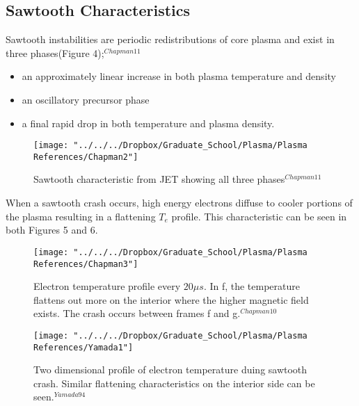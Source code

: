 \documentclass{article}
\begin{document}
\subsection{Sawtooth Characteristics}
Sawtooth instabilities are periodic redistributions of core plasma and exist in three phases(Figure 4);$^{Chapman11}$
\begin{itemize}
\item an approximately linear increase in both plasma temperature and density
\item an oscillatory precursor phase
\item a final rapid drop in both temperature and plasma density.
\end{itemize}
\begin{figure}[p]
\centering
\texttt{[image: "../../../Dropbox/Graduate\_School/Plasma/Plasma References/Chapman2"]}
\caption{Sawtooth characteristic from JET showing all three phases$^{Chapman11}$}
\label{fig:Chapman2}
\end{figure}
When a sawtooth crash occurs, high energy electrons diffuse to cooler portions of the plasma resulting in a flattening $T_e$ profile.  This characteristic can be seen in both Figures 5 and 6.
\begin{figure}[p]
\centering
\texttt{[image: "../../../Dropbox/Graduate\_School/Plasma/Plasma References/Chapman3"]}
\caption{Electron temperature profile every $20\mu s$. In f, the temperature flattens out more on the interior where the higher magnetic field exists. The crash occurs between frames f and g.$^{Chapman10}$}
\label{fig:Chapman3}
\end{figure}
\begin{figure}[p]
\centering
\texttt{[image: "../../../Dropbox/Graduate\_School/Plasma/Plasma References/Yamada1"]}
\caption{Two dimensional profile of electron temperature duing sawtooth crash. Similar flattening characteristics on the interior side can be seen.$^{Yamada94}$}
\label{fig:Yamada1}
\end{figure}
\end{document}
